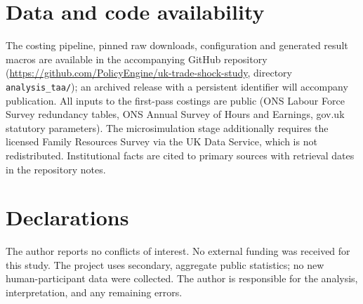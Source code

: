 \section*{Data and code availability}

The costing pipeline, pinned raw downloads, configuration and generated
result macros are available in the accompanying GitHub repository
(\url{https://github.com/PolicyEngine/uk-trade-shock-study}, directory
\texttt{analysis\_taa/}); an archived release with a persistent identifier
will accompany publication. All inputs to the first-pass costings are
public (ONS Labour Force Survey redundancy tables, ONS Annual Survey of
Hours and Earnings, gov.uk statutory parameters). The microsimulation
stage additionally requires the licensed Family Resources Survey via the
UK Data Service, which is not redistributed. Institutional facts are
cited to primary sources with retrieval dates in the repository notes.

\section*{Declarations}

The author reports no conflicts of interest. No external funding was
received for this study. The project uses secondary, aggregate public
statistics; no new human-participant data were collected. The author is
responsible for the analysis, interpretation, and any remaining errors.
